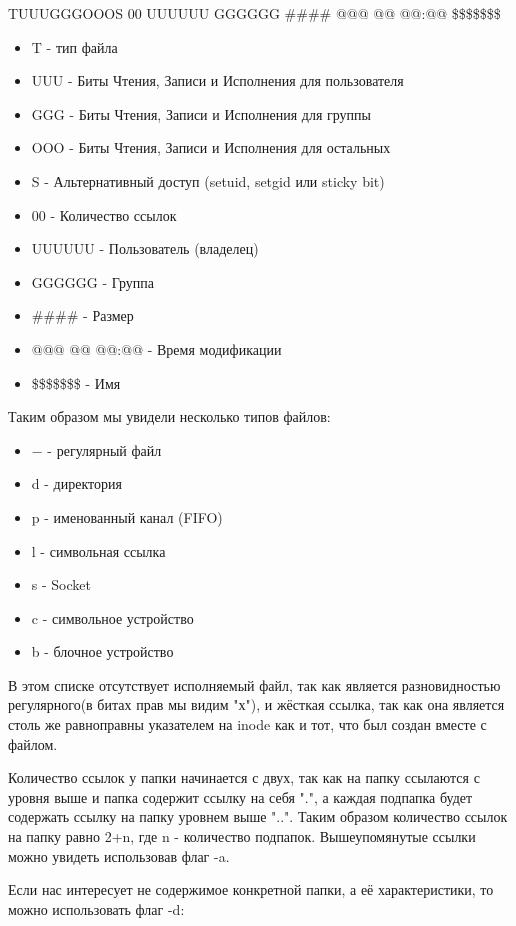 \documentclass[a4paper]{article}
\begin{document}
TUUUGGGOOOS   00  UUUUUU GGGGGG \#\#\#\# @@@ @@ @@:@@  \$\$\$\$\$\$\$ 
\begin{itemize}
\item T - тип файла
\item UUU - Биты Чтения, Записи и Исполнения для пользователя
\item GGG - Биты Чтения, Записи и Исполнения для группы
\item OOO - Биты Чтения, Записи и Исполнения для остальных
\item S - Альтернативный доступ (setuid, setgid или sticky bit)
\item 00 - Количество ссылок
\item UUUUUU - Пользователь (владелец)
\item GGGGGG - Группа
\item \#\#\#\# - Размер
\item @@@ @@ @@:@@ - Время модификации
\item \$\$\$\$\$\$\$ - Имя
\end{itemize}

Таким образом мы увидели несколько типов файлов:
\begin{itemize}
\item $-$ - регулярный файл
\item d - директория
\item p - именованный канал (FIFO)
\item l - символьная ссылка
\item s - Socket
\item c - символьное устройство
\item b - блочное устройство
\end{itemize}
В этом списке отсутствует исполняемый файл, так как является разновидностью регулярного(в битах прав мы видим "х"), и жёсткая ссылка, так как она является столь же равноправны указателем на inode как и тот, что был создан вместе с файлом.

Количество ссылок у папки начинается с двух, так как на папку ссылаются с уровня выше и папка содержит ссылку на себя ".", а каждая подпапка будет содержать ссылку на папку уровнем выше "..". Таким образом количество ссылок на папку равно 2+n, где n - количество подпапок. Вышеупомянутые ссылки можно увидеть использовав флаг -a.



Если нас интересует не содержимое конкретной папки, а её характеристики, то можно использовать флаг -d:

\end{document}

